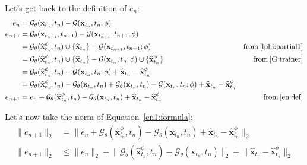 \noindent Let's get back to the definition of $e_n$:
\begin{align}
    e_n & = \mathcal{G}_{\theta}(\mathbf{x}_{t_n}, t_{n}) - \mathcal{G}(\mathbf{x}_{t_n}, t_{n}; \phi) \label{en:def} \\
    e_{n+1} & = \mathcal{G}_{\theta}(\mathbf{x}_{t_{n+1}}, t_{n+1}) - \mathcal{G}(\mathbf{x}_{t_{n+1}}, t_{n+1}; \phi) \\
    & = \mathcal{G}_{\theta}(\widehat{\mathbf{x}}_{t_{n}}^{\phi}, t_{n}) \cup \{\widehat{\mathbf{x}}_{t_n} \} - \mathcal{G}(\mathbf{x}_{t_{n+1}}, t_{n+1}; \phi)  & \text{from} \: \ref{lphi:partial1} \\
    & = \mathcal{G}_{\theta}(\widehat{\mathbf{x}}_{t_{n}}^{\phi}, t_{n}) \cup \{\widehat{\mathbf{x}}_{t_n} \} - \mathcal{G}(\mathbf{x}_{t_n}, t_{n}; \phi) \cup \{\widehat{\mathbf{x}}_{t_n}^{\phi} \}  & \text{from} \: \ref{G:trainer} \\
    & = \mathcal{G}_{\theta}(\widehat{\mathbf{x}}_{t_{n}}^{\phi}, t_n) - \mathcal{G}(\mathbf{x}_{t_n}, t_n; \phi) + \widehat{\mathbf{x}}_{t_n}  - \widehat{\mathbf{x}}_{t_n}^{\phi} \\
    & = \mathcal{G}_{\theta}(\widehat{\mathbf{x}}_{t_{n}}^{\phi}, t_n) - \mathcal{G}_{\theta}(\mathbf{x}_{t_n}, t_n) + \mathcal{G}_{\theta}(\mathbf{x}_{t_n}, t_n) - \mathcal{G}(\mathbf{x}_{t_n}, t_n; \phi) + \widehat{\mathbf{x}}_{t_n}  - \widehat{\mathbf{x}}_{t_n}^{\phi} \\
    e_{n+1} & = e_n + \mathcal{G}_{\theta}(\widehat{\mathbf{x}}_{t_{n}}^{\phi}, t_n) - \mathcal{G}_{\theta}(\mathbf{x}_{t_n}, t_n) + \widehat{\mathbf{x}}_{t_n}  - \widehat{\mathbf{x}}_{t_n}^{\phi}   & \text{from} \: \ref{en:def} \label{en1:formula}
\end{align}

\noindent Let's now take the norm of Equation~\ref{en1:formula}:
\begin{align}
        \lVert e_{n+1} \lVert_2 & = \lVert e_n + \mathcal{G}_{\theta}(\widehat{\mathbf{x}}_{t_{n}}^{\phi}, t_n) - \mathcal{G}_{\theta}(\mathbf{x}_{t_n}, t_n) + \widehat{\mathbf{x}}_{t_n}  - \widehat{\mathbf{x}}_{t_n}^{\phi} \lVert_2 \\
        \lVert e_{n+1} \lVert_2 & \leq \lVert e_n \rVert_2 + \lVert \mathcal{G}_{\theta}(\widehat{\mathbf{x}}_{t_{n}}^{\phi}, t_n) - \mathcal{G}_{\theta}(\mathbf{x}_{t_n}, t_n) \rVert_2 + \lVert \widehat{\mathbf{x}}_{t_n}  - \widehat{\mathbf{x}}_{t_n}^{\phi} \rVert_2 \label{en1:norm}
\end{align}

